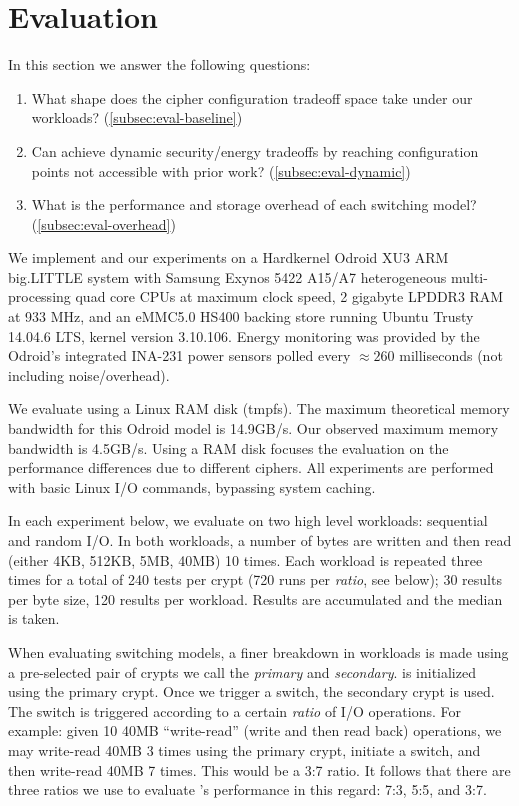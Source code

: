 \section{Evaluation}\label{sec:eval}

In this section we answer the following questions:

\begin{enumerate}
  \item What shape does the cipher configuration tradeoff space take under our
  workloads? (\cref{subsec:eval-baseline})
  \item Can \sys achieve dynamic security/energy tradeoffs by reaching
  configuration points not accessible with prior work?
  (\cref{subsec:eval-dynamic})
  \item What is the performance and storage overhead of each switching model?
  (\cref{subsec:eval-overhead})
\end{enumerate}

 We implement \sys and our experiments on a
Hardkernel Odroid XU3 ARM big.LITTLE system with Samsung Exynos 5422 A15/A7
heterogeneous multi-processing quad core CPUs at maximum clock speed, 2 gigabyte
LPDDR3 RAM at 933 MHz, and an eMMC5.0 HS400 backing store running Ubuntu Trusty
14.04.6 LTS, kernel version 3.10.106. Energy monitoring was provided by the
Odroid's integrated INA-231 power sensors polled every $\approx{260}$
milliseconds (not including noise/overhead).

We evaluate \sys using a Linux RAM disk (tmpfs). The maximum theoretical memory
bandwidth for this Odroid model is 14.9GB/s\@. Our observed maximum memory
bandwidth is 4.5GB/s. Using a RAM disk focuses the evaluation on the performance
differences due to different ciphers. All experiments are performed with basic
Linux I/O commands, bypassing system caching.

 In each experiment below, we evaluate \sys on two high
level workloads: sequential and random I/O. In both workloads, a number of bytes
are written and then read (either 4KB, 512KB, 5MB, 40MB) 10 times. Each workload
is repeated three times for a total of 240 tests per crypt (720 runs per {\em
ratio}, see below); 30 results per byte size, 120 results per workload. Results
are accumulated and the median is taken.

When evaluating switching models, a finer breakdown in workloads is made using a
pre-selected pair of crypts we call the {\em primary} and {\em secondary}. \sys
is initialized using the primary crypt. Once we trigger a switch, the secondary
crypt is used. The switch is triggered according to a certain {\em ratio} of I/O
operations. For example: given 10 40MB ``write-read'' (write and then read back)
operations, we may write-read 40MB 3 times using the primary crypt, initiate a
switch, and then write-read 40MB 7 times. This would be a 3:7 ratio. It follows
that there are three ratios we use to evaluate \sys's performance in this
regard: 7:3, 5:5, and 3:7.


